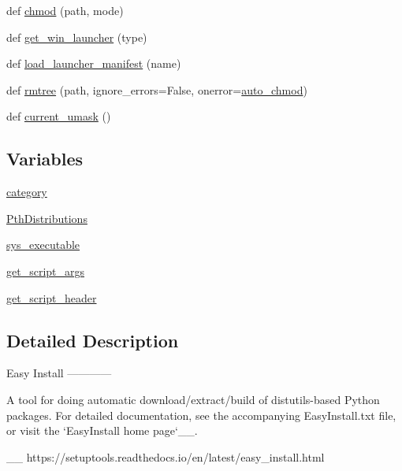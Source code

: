 \begin{DoxyCompactItemize}
\item 
def \hyperlink{namespacesetuptools_1_1command_1_1easy__install_a666df55c05e45cc268e342c515c1119c}{chmod} (path, mode)
\item 
def \hyperlink{namespacesetuptools_1_1command_1_1easy__install_ac8a1f99006fa5280139c286ec6d3e782}{get\+\_\+win\+\_\+launcher} (type)
\item 
def \hyperlink{namespacesetuptools_1_1command_1_1easy__install_a5955dddc6fc2c08a06edda8964b2b97a}{load\+\_\+launcher\+\_\+manifest} (name)
\item 
def \hyperlink{namespacesetuptools_1_1command_1_1easy__install_afb28853ce5af8986b0a4dbf9a38cc732}{rmtree} (path, ignore\+\_\+errors=False, onerror=\hyperlink{namespacesetuptools_1_1command_1_1easy__install_a744f4ccbe5bd43d99c471ab3b9fd0809}{auto\+\_\+chmod})
\item 
def \hyperlink{namespacesetuptools_1_1command_1_1easy__install_a0de286231358ef770b15f22383db6d4c}{current\+\_\+umask} ()
\end{DoxyCompactItemize}
\subsection*{Variables}
\begin{DoxyCompactItemize}
\item 
\hyperlink{namespacesetuptools_1_1command_1_1easy__install_aee298a1c6afa16b18a8b1ad432b6f88a}{category}
\item 
\hyperlink{namespacesetuptools_1_1command_1_1easy__install_a08d9dd33967b4546f8c8ab0f1d299915}{Pth\+Distributions}
\item 
\hyperlink{namespacesetuptools_1_1command_1_1easy__install_a48f76612889173175965851e9c795b8a}{sys\+\_\+executable}
\item 
\hyperlink{namespacesetuptools_1_1command_1_1easy__install_a267b9ab1d7874774429df54a3da6ad66}{get\+\_\+script\+\_\+args}
\item 
\hyperlink{namespacesetuptools_1_1command_1_1easy__install_ab52dc3bb25810daf44071c5f8e29e1f1}{get\+\_\+script\+\_\+header}
\end{DoxyCompactItemize}


\subsection{Detailed Description}
\begin{DoxyVerb}Easy Install
------------

A tool for doing automatic download/extract/build of distutils-based Python
packages.  For detailed documentation, see the accompanying EasyInstall.txt
file, or visit the `EasyInstall home page`__.

__ https://setuptools.readthedocs.io/en/latest/easy_install.html\end{DoxyVerb}
 

